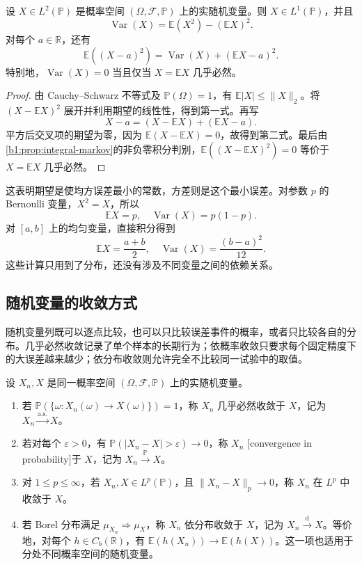 \begin{proposition}\label{b1:prop:30-variance-formula}
设 \(X\in L^2(\mathbb P)\) 是概率空间 \((\Omega,\mathcal F,\mathbb P)\) 上的实随机变量。则 \(X\in L^1(\mathbb P)\)，并且
\[
 \operatorname{Var}(X)=\mathbb E(X^2)-(\mathbb E X)^2.
\]
对每个 \(a\in\mathbb R\)，还有
\[
 \mathbb E\left((X-a)^2\right)
 =\operatorname{Var}(X)+(\mathbb E X-a)^2.
\]
特别地，\(\operatorname{Var}(X)=0\) 当且仅当 \(X=\mathbb E X\) 几乎必然。
\end{proposition}
\begin{proof}
由 Cauchy--Schwarz 不等式及 \(\mathbb P(\Omega)=1\)，有 \(\mathbb E|X|\leq\|X\|_2\)。将 \((X-\mathbb E X)^2\) 展开并利用期望的线性性，得到第一式。再写
\[
 X-a=(X-\mathbb E X)+(\mathbb E X-a).
\]
平方后交叉项的期望为零，因为 \(\mathbb E(X-\mathbb E X)=0\)，故得到第二式。最后由\cref{b1:prop:integral-markov}的非负零积分判别，\(\mathbb E((X-\mathbb E X)^2)=0\) 等价于 \(X=\mathbb E X\) 几乎必然。
\end{proof}

这表明期望是使均方误差最小的常数，方差则是这个最小误差。对参数 \(p\) 的 Bernoulli 变量，\(X^2=X\)，所以
\[
 \mathbb E X=p,
 \quad \operatorname{Var}(X)=p(1-p).
\]
对 \([a,b]\) 上的均匀变量，直接积分得到
\[
 \mathbb E X=\frac{a+b}{2},
 \quad \operatorname{Var}(X)=\frac{(b-a)^2}{12}.
\]
这些计算只用到了分布，还没有涉及不同变量之间的依赖关系。

\subsection{随机变量的收敛方式}
\label{b1:subsec:300104}

随机变量列既可以逐点比较，也可以只比较误差事件的概率，或者只比较各自的分布。几乎必然收敛记录了单个样本的长期行为；依概率收敛只要求每个固定精度下的大误差越来越少；依分布收敛则允许完全不比较同一试验中的取值。

\begin{definition}\label{b1:def:30-convergence-modes}
设 \(X_n,X\) 是同一概率空间 \((\Omega,\mathcal F,\mathbb P)\) 上的实随机变量。
\begin{enumerate}
 \item 若 \(\mathbb P(\{\omega:X_n(\omega)\to X(\omega)\})=1\)，称 \(X_n\) 几乎必然收敛于 \(X\)，记为 \(X_n\xrightarrow{\mathrm{a.s.}}X\)。
 \item 若对每个 \(\varepsilon>0\)，有 \(\mathbb P(|X_n-X|>\varepsilon)\to0\)，称 \(X_n\) [convergence in probability]于 \(X\)，记为 \(X_n\xrightarrow{\mathbb P}X\)。
 \item 对 \(1\leq p\leq\infty\)，若 \(X_n,X\in L^p(\mathbb P)\)，且 \(\|X_n-X\|_p\to0\)，称 \(X_n\) 在 \(L^p\) 中收敛于 \(X\)。
 \item 若 Borel 分布满足 \(\mu_{X_n}\Rightarrow\mu_X\)，称 \(X_n\) 依分布收敛于 \(X\)，记为 \(X_n\xrightarrow{\mathrm d}X\)。等价地，对每个 \(h\in C_b(\mathbb R)\)，有 \(\mathbb E(h(X_n))\to\mathbb E(h(X))\)。这一项也适用于分处不同概率空间的随机变量。
\end{enumerate}
\end{definition}

